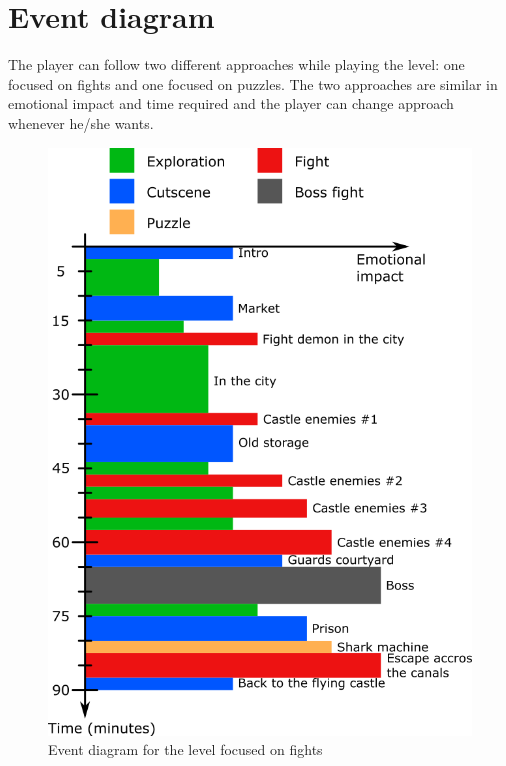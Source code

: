 \section{Event diagram}

The player can follow two different approaches while playing the level: one focused on fights and one focused on puzzles. The two approaches are similar in emotional impact and time required and the player can change approach whenever he/she wants.

\begin{figure}[H]
  \centering
  \includegraphics[width=12cm]{../Images/Diagrams/eventDiagramFights}
  \caption{Event diagram for the level focused on fights}
\end{figure}

